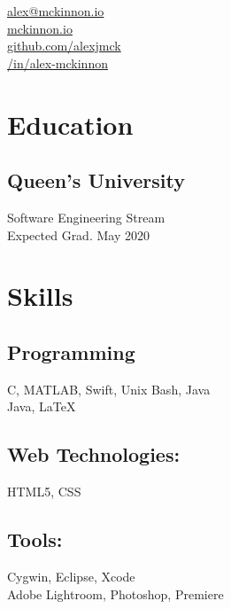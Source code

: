 \documentclass[]{hieudo-build}
\begin{document}
%
%
{
	\faEnvelope \href{mailto:alex@mckinnon.io}{ alex@mckinnon.io}\\
    \faGlobe \href{https://mckinnon.io}{ mckinnon.io}\\
	\faGithub \href{https://github.com/alexjmck}{   github.com/alexjmck}\\
	\faLinkedinSquare \href{https://www.linkedin.com/in/alex-mckinnon}{   /in/alex-mckinnon}
}
    
%
%
\begin{minipage}[t]{0.34\textwidth} 

\section{Education} 

\subsection{Queen's University}
Software Engineering Stream \\
Expected Grad. May 2020 \\
\sectionsep

\section{Skills}
\subsection{Programming}
C, MATLAB, Swift, Unix Bash, Java\\ 
Java, \LaTeX

\subsection{Web Technologies:}
HTML5, CSS \\

\subsection{Tools:}
Cygwin, Eclipse, Xcode\\
Adobe Lightroom, Photoshop, Premiere \\ 


\end{minipage}
\end{document}
